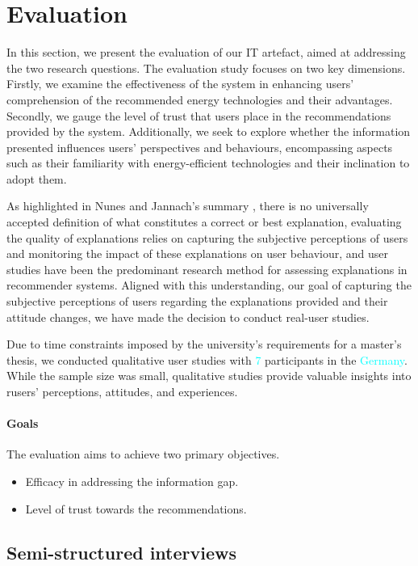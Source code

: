 \chapter{Evaluation}

In this section, we present the evaluation of our IT artefact, aimed at addressing the two research questions.
The evaluation study focuses on two key dimensions. 
Firstly, we examine the effectiveness of the system in enhancing users' comprehension of the recommended energy technologies and their advantages. 
Secondly, we gauge the level of trust that users place in the recommendations provided by the system. 
Additionally, we seek to explore whether the information presented influences users' perspectives and behaviours, 
encompassing aspects such as their familiarity with energy-efficient technologies and their inclination to adopt them. 

As highlighted in Nunes and Jannach's summary \cite{Nunes2020}, 
there is no universally accepted definition of what constitutes a correct or best explanation, 
evaluating the quality of explanations relies on capturing the subjective perceptions of users and monitoring the impact of these explanations on user behaviour, 
and user studies have been the predominant research method for assessing explanations in recommender systems.
Aligned with this understanding, our goal of capturing the subjective perceptions of users regarding the explanations provided and their attitude changes, 
we have made the decision to conduct real-user studies. 

Due to time constraints imposed by the university's requirements for a master's thesis, we conducted qualitative user studies with \textcolor{cyan}{7} participants in the \textcolor{cyan}{Germany}. 
While the sample size was small, qualitative studies provide valuable insights into rusers' perceptions, attitudes, and experiences.


\subsubsection{Goals}

The evaluation aims to achieve two primary objectives.
\begin{itemize}
  \item Efficacy in addressing the information gap.
  \item Level of trust towards the recommendations.
\end{itemize}


\section{Semi-structured interviews}

